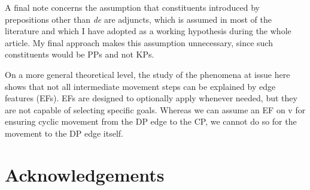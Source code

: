 \documentclass[output=paper]{langsci/langscibook}
\begin{document}
A final note concerns the assumption that constituents introduced by prepositions other than \textit{de} are adjuncts, which is assumed in most of the literature and which I have adopted as a working hypothesis during the whole article. My final approach makes this assumption unnecessary, since such constituents would be PPs and not KPs.

On a more general theoretical level, the study of the phenomena at issue here shows that not all intermediate movement steps can be explained by  edge features (EFs). EFs are designed to optionally apply whenever needed, but they are not capable of selecting specific goals. Whereas we can assume an EF on v for ensuring cyclic movement from the DP edge to the CP, we cannot do so for the movement to the DP edge itself.

\section*{Acknowledgements}
\end{document}
